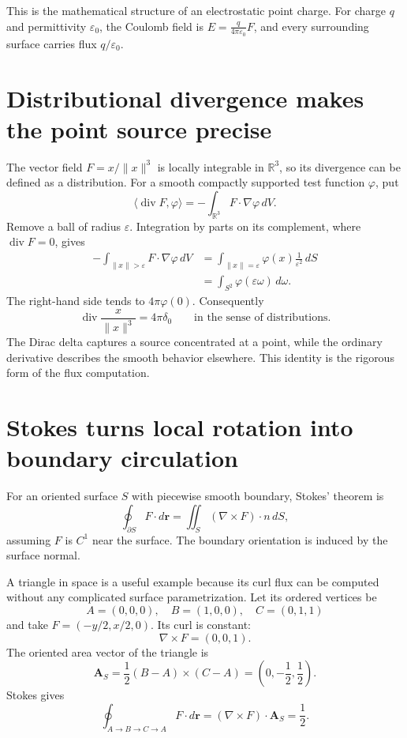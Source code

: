 This is the mathematical structure of an electrostatic point charge. For charge \(q\) and permittivity \(\varepsilon_0\), the Coulomb field is \(E=\frac{q}{4\pi\varepsilon_0}F\), and every surrounding surface carries flux \(q/\varepsilon_0\).

\section{Distributional divergence makes the point source precise}

The vector field \(F=x/\|x\|^3\) is locally integrable in \(\mathbb R^3\), so its divergence can be defined as a distribution. For a smooth compactly supported test function \(\varphi\), put
\[
 \langle\operatorname{div}F,\varphi\rangle
 =-\int_{\mathbb R^3}F\cdot\nabla\varphi\,dV.
\]
Remove a ball of radius \(\varepsilon\). Integration by parts on its complement, where \(\operatorname{div}F=0\), gives
\[
\begin{aligned}
 -\int_{\|x\|>\varepsilon}F\cdot\nabla\varphi\,dV
 &=\int_{\|x\|=\varepsilon}
       \varphi(x)\frac1{\varepsilon^2}\,dS\\
 &=\int_{S^2}\varphi(\varepsilon\omega)\,d\omega.
\end{aligned}
\]
The right-hand side tends to \(4\pi\varphi(0)\). Consequently
\[
 \boxed{\operatorname{div}\frac{x}{\|x\|^3}=4\pi\delta_0}
 \qquad\text{in the sense of distributions}.
\]
The Dirac delta captures a source concentrated at a point, while the ordinary derivative describes the smooth behavior elsewhere. This identity is the rigorous form of the flux computation.

\section{Stokes turns local rotation into boundary circulation}

For an oriented surface \(S\) with piecewise smooth boundary, Stokes' theorem is
\[
 \boxed{\oint_{\partial S}F\cdot d\mathbf r
 =\iint_S(\nabla\times F)\cdot n\,dS,}
\]
assuming \(F\) is \(C^1\) near the surface. The boundary orientation is induced by the surface normal.

A triangle in space is a useful example because its curl flux can be computed without any complicated surface parametrization. Let its ordered vertices be
\[
 A=(0,0,0),\quad B=(1,0,0),\quad C=(0,1,1)
\]
and take \(F=(-y/2,x/2,0)\). Its curl is constant:
\[
 \nabla\times F=(0,0,1).
\]
The oriented area vector of the triangle is
\[
 \mathbf A_S=\frac12(B-A)\times(C-A)
             =\left(0,-\frac12,\frac12\right).
\]
Stokes gives
\[
 \oint_{A\to B\to C\to A}F\cdot d\mathbf r
 =(\nabla\times F)\cdot\mathbf A_S=\frac12.
\]

